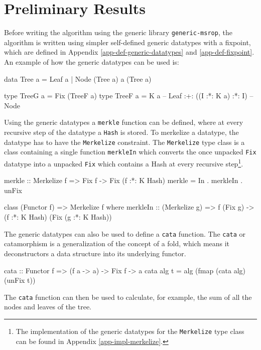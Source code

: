 \section{Preliminary Results}
Before writing the algorithm using the generic library \texttt{generic-msrop}\cite{miraldo2018sums}, the algorithm is written using simpler self-defined generic datatypes with a fixpoint, which are defined in Appendix \ref{app-def-generic-datatypes} and \ref{app-def-fixpoint}. An example of how the generic datatypes can be used is:
\begin{haskell}
data Tree a = Leaf a
            | Node (Tree a) a (Tree a)

type TreeG a = Fix (TreeF a)
type TreeF a = K a                  -- Leaf
            :+: ((I :*: K a) :*: I) -- Node
\end{haskell}

Using the generic datatypes a \texttt{merkle} function can be defined, where at every recursive step of the datatype a \texttt{Hash} is stored. To merkelize a datatype, the datatype has to have the \texttt{Merkelize} constraint. The \texttt{Merkelize} type class is a class containing a single function \texttt{merkleIn} which converts the once unpacked \texttt{Fix} datatype into a unpacked \texttt{Fix} which contains a Hash at every recursive step\footnote{The implementation of the generic datatypes for the \texttt{Merkelize} type class can be found in Appendix \ref{app-impl-merkelize}.}.

\begin{haskell}
merkle :: Merkelize f => Fix f -> Fix (f :*: K Hash)
merkle = In . merkleIn . unFix
\end{haskell}
\begin{haskell}
class (Functor f) => Merkelize f where
  merkleIn :: (Merkelize g) 
           => f (Fix g) -> (f :*: K Hash) (Fix (g :*: K Hash))
\end{haskell}

The generic datatypes can also be used to define a \texttt{cata} function. The \texttt{cata} or catamorphism is a generalization of the concept of a fold, which means it deconstructors a data structure into its underlying functor\cite{HaskellWikiCatamorphism}.

\begin{haskell}
cata :: Functor f => (f a -> a) -> Fix f -> a
cata alg t = alg (fmap (cata alg) (unFix t)) 
\end{haskell}

The \texttt{cata} function can then be used to calculate, for example, the sum of all the nodes and leaves of the tree.


